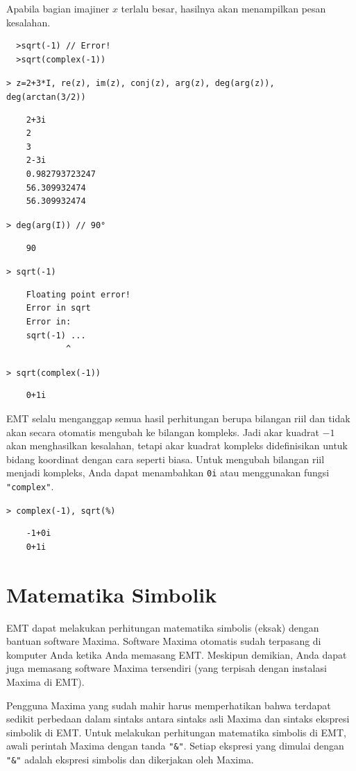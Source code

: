 \documentclass[11pt, a4paper]{article}
\newcommand{\emtcmd}[1]{\noindent\texttt{\textcolor{emtcommand}{>}\ #1}\par\smallskip}
\begin{document}
Apabila bagian imajiner $x$ terlalu besar, hasilnya akan menampilkan pesan kesalahan.
\begin{verbatim}
  >sqrt(-1) // Error!
  >sqrt(complex(-1))
\end{verbatim}

\emtcmd{z=2+3*I, re(z), im(z), conj(z), arg(z), deg(arg(z)), deg(arctan(3/2))}
\begin{verbatim}
    2+3i
    2
    3
    2-3i
    0.982793723247
    56.309932474
    56.309932474
\end{verbatim}

\emtcmd{deg(arg(I)) \textcolor{emtcomment}{// 90°}}
\begin{verbatim}
    90
\end{verbatim}

\emtcmd{sqrt(-1)}
\begin{verbatim}
    Floating point error!
    Error in sqrt
    Error in:
    sqrt(-1) ...
            ^
\end{verbatim}

\emtcmd{sqrt(complex(-1))}
\begin{verbatim}
    0+1i
\end{verbatim}

EMT selalu menganggap semua hasil perhitungan berupa bilangan riil dan tidak akan secara otomatis mengubah ke bilangan kompleks. Jadi akar kuadrat $-1$ akan menghasilkan kesalahan, tetapi akar kuadrat kompleks didefinisikan untuk bidang koordinat dengan cara seperti biasa. Untuk mengubah bilangan riil menjadi kompleks, Anda dapat menambahkan \texttt{0i} atau menggunakan fungsi \texttt{"complex"}.

\emtcmd{complex(-1), sqrt(\%)}
\begin{verbatim}
    -1+0i 
    0+1i
\end{verbatim}

\section*{Matematika Simbolik}

EMT dapat melakukan perhitungan matematika simbolis (eksak) dengan bantuan software Maxima. Software Maxima otomatis sudah terpasang di komputer Anda ketika Anda memasang EMT. Meskipun demikian, Anda dapat juga memasang software Maxima tersendiri (yang terpisah dengan instalasi Maxima di EMT).

Pengguna Maxima yang sudah mahir harus memperhatikan bahwa terdapat sedikit perbedaan dalam sintaks antara sintaks asli Maxima dan sintaks ekspresi simbolik di EMT. Untuk melakukan perhitungan matematika simbolis di EMT, awali perintah Maxima dengan tanda \texttt{"\&"}. Setiap ekspresi yang dimulai dengan \texttt{"\&"} adalah ekspresi simbolis dan dikerjakan oleh Maxima.
\end{document}
